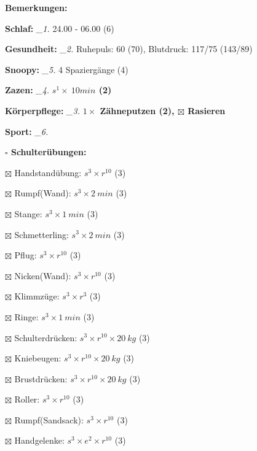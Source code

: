 \documentclass[10pt,a4paper]{article}
\newcommand\prop[1] {{\color {alizarin} {\bf #1}}}             %
\newcommand\draf[1] {{\color {amber(sae/ece)} {\bf #1}}}       %
\newcommand\mand[1] {{\color {burntorange} {\bf #1}}}          %
\newcommand\topspace{\vskip -15pt \hskip 20pt}
\newcommand\n[1] { {\sl #1.} \hskip 5pt }
\begin{document}
\begin{mdframed}[style=daystyle]
  \begin{labeling}{{\mand {Bemerkungen:}}}
    \setlength\itemsep{-3pt}
  \item[{\mand {Schlaf:}}]        \n{\_1} 24.00 - 06.00 (6)
  \item[{\mand {Gesundheit:}}]    \n{\_2} Ruhepuls: 60 (70), Blutdruck: 117/75 (143/89)
  \item[{\mand {Snoopy:}}]        \n{\_5} 4 Spaziergänge (4)
  \item[{\mand {Zazen:}}]         \n{\_4} {\draf {$s^1 \times\ 10 min$ (2)}}
  \item[{\mand {Körperpflege:}}]  \n{\_3} {\draf {$1 \times$ Zähneputzen (2), $\boxtimes$ Rasieren}}
  \item[{\mand {Sport:}}]         \n{\_6}
    \topspace
    \begin{minipage}{0.75\textwidth}  
      \begin{labeling}{\prop {$\square$ {Schulterübungen:}}} 
        \setlength\itemsep{-3pt}
      \item[$\boxtimes$ Handstandübung:]  $s^3 \times r^{10}$ (3)
      \item[$\boxtimes$ Rumpf(Wand):]     $s^3 \times 2\ min$ (3)
      \item[$\boxtimes$ Stange:]          $s^3 \times 1\ min$ (3)
      \item[$\boxtimes$ Schmetterling:]   $s^3 \times 2\ min$ (3)
      \item[$\boxtimes$ Pflug:]           $s^3 \times r^{10}$ (3)
      \item[$\boxtimes$ Nicken(Wand):]    $s^3 \times r^{10}$ (3)
      \item[$\boxtimes$ Klimmzüge:]       $s^3 \times r^3$ (3)
      \item[$\boxtimes$ Ringe:]           $s^3 \times 1\ min$ (3)
      \item[$\boxtimes$ Schulterdrücken:] $s^3 \times r^{10} \times 20\ kg$ (3)
      \item[$\boxtimes$ Kniebeugen:]      $s^3 \times r^{10} \times 20\ kg$ (3)
      \item[$\boxtimes$ Brustdrücken:]    $s^3 \times r^{10} \times 20\ kg$ (3)
      \item[$\boxtimes$ Roller:]          $s^3 \times r^{10}$ (3)
      \item[$\boxtimes$ Rumpf(Sandsack):] $s^3 \times r^{10}$ (3)
      \item[$\boxtimes$ Handgelenke:]     $s^3 \times e^2 \times r^{10}$ (3)

\end{labeling}
\end{minipage}
\end{labeling}
\end{mdframed}
\end{document}
